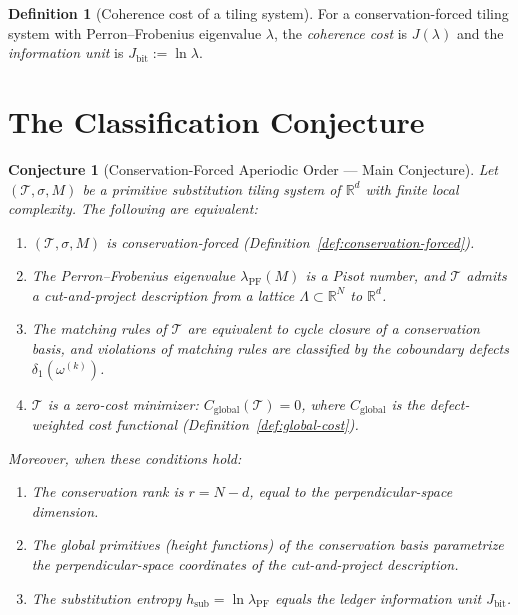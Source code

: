\documentclass[12pt]{article}
\newtheorem{conjecture}[theorem]{Conjecture}
\theoremstyle{definition}
\newtheorem{definition}[theorem]{Definition}
\theoremstyle{remark}
\newcommand{\RR}{\mathbb{R}}
\DeclareMathOperator{\PF}{PF}
\begin{document}
\begin{definition}[Coherence cost of a tiling system]
\label{def:coherence-cost}
For a conservation-forced tiling system with Perron--Frobenius eigenvalue $\lambda$, the \emph{coherence cost} is $J(\lambda)$ and the \emph{information unit} is $J_{\mathrm{bit}} := \ln \lambda$.
\end{definition}


\section{The Classification Conjecture}
\label{sec:conjecture}

\begin{conjecture}[Conservation-Forced Aperiodic Order --- Main Conjecture]
\label{conj:main}
Let $(\mathcal{T}, \sigma, M)$ be a primitive substitution tiling system of $\RR^d$ with finite local complexity. The following are equivalent:
\begin{enumerate}[label=(\alph*)]
\item \label{conj:CF} $(\mathcal{T}, \sigma, M)$ is conservation-forced (Definition~\ref{def:conservation-forced}).
\item \label{conj:Pisot} The Perron--Frobenius eigenvalue $\lambda_\PF(M)$ is a Pisot number, and $\mathcal{T}$ admits a cut-and-project description from a lattice $\Lambda \subset \RR^N$ to $\RR^d$.
\item \label{conj:matching} The matching rules of $\mathcal{T}$ are equivalent to cycle closure of a conservation basis, and violations of matching rules are classified by the coboundary defects $\delta_1(\omega^{(k)})$.
\item \label{conj:variational} $\mathcal{T}$ is a zero-cost minimizer: $C_{\mathrm{global}}(\mathcal{T}) = 0$, where $C_{\mathrm{global}}$ is the defect-weighted cost functional (Definition~\ref{def:global-cost}).
\end{enumerate}
Moreover, when these conditions hold:
\begin{enumerate}[label=(\roman*)]
\item The conservation rank is $r = N - d$, equal to the perpendicular-space dimension.
\item The global primitives (height functions) of the conservation basis parametrize the perpendicular-space coordinates of the cut-and-project description.
\item The substitution entropy $h_{\mathrm{sub}} = \ln \lambda_\PF$ equals the ledger information unit $J_{\mathrm{bit}}$.
\end{enumerate}
\end{conjecture}
\end{document}
